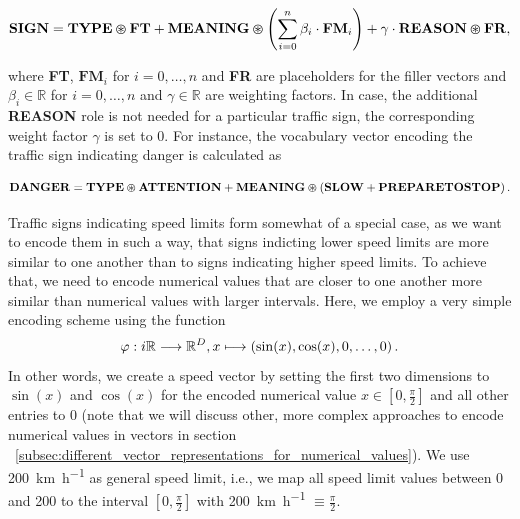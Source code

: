 \begin{equation}
    \label{eq:semantic_vocab_traffic_signs}
    \mathbf{SIGN} = \mathbf{TYPE} \varoast \mathbf{FT} + \mathbf{MEANING} \varoast \left( \sum\limits_{i=0}^{n} \beta_{i} \cdot  \mathbf{FM}_{i}  \right) + \gamma \cdot \mathbf{REASON} \varoast \mathbf{FR}, 
\end{equation}

where \textbf{FT}, $\mathbf{FM}_{i}$ for $i = 0, \ldots, n$ and \textbf{FR} are placeholders for the filler vectors and $\beta_{i} \in \mathbb{R} $ for $i = 0, \ldots, n$ and $\gamma \in \mathbb{R} $ are weighting factors.
In case, the additional \textbf{REASON} role is not needed for a particular traffic sign, the corresponding weight factor $\gamma$ is set to \num{0}.
For instance, the vocabulary vector encoding the traffic sign indicating danger is calculated as

\begin{equation}
\label{eq:semantic_vocab_traffic_sign_example}
\mathbf{DANGER} = \mathbf{TYPE} \varoast \mathbf{ATTENTION} + \mathbf{MEANING} \varoast  \left(\mathbf{SLOW} + \mathbf{PREPARETOSTOP}\right).
\end{equation}

Traffic signs indicating speed limits form somewhat of a special case, as we want to encode them in such a way, that signs indicting lower speed limits are more similar to one another than to signs indicating higher speed limits.
To achieve that, we need to encode numerical values that are closer to one another more similar than numerical values with larger intervals.
Here, we employ a very simple encoding scheme using the function 
\begin{equation}
\label{eq:cosin_vec_func}
\varphi: i\mathbb{R} \longrightarrow \mathbb{R}^{D}, x \longmapsto \left(\sin(x), \cos(x), 0, \ldots, 0\right).
\end{equation}
In other words, we create a speed vector by setting the first two dimensions to $\sin(x)$ and $\cos(x)$ for the encoded numerical value $x \in [0,\frac{\pi}{2}]$ and all other entries to \num{0} (note that we will discuss other, more complex approaches to encode numerical values in vectors in section ~\ref{subsec:different_vector_representations_for_numerical_values}).
We use \SI[per-mode=symbol]{200}{\kilo\meter\per\hour} as general speed limit, i.e., we map all speed limit values between \num{0} and \num{200} to the interval $\left[0, \frac{\pi}{2}\right]$ with \SI[per-mode=symbol]{200}{\kilo\meter\per\hour} $\equiv \frac{\pi}{2}$.

